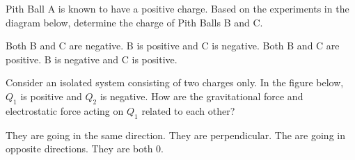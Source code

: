 \documentclass[answers]{exam}
\begin{document}
\begin{questions}
\question
Pith Ball A is known to have a positive charge.  Based on the experiments in the diagram below, determine the charge of Pith Balls B and C.

\begin{center}
\hspace{1cm}
\end{center}

\begin{randomizechoices}
    \correctchoice Both B and C are negative.
    \choice B is positive and C is negative.
    \choice Both B and C are positive.
    \choice B is negative and C is positive.
\end{randomizechoices}

\question
Consider an isolated system consisting of two charges only. In the figure below, $Q_1$ is positive and $Q_2$ is negative.  How are the gravitational force and electrostatic force acting on $Q_1$ related to each other?

\begin{minipage}{9cm}
\begin{randomizechoices}
    \correctchoice They are going in the same direction.
    \choice They are perpendicular.
    \choice The are going in opposite directions.
    \choice They are both 0.
\end{randomizechoices}
\end{minipage}
%
\begin{minipage}{3cm}
\centering
{}    
\end{minipage}





\end{questions}
\end{document}
